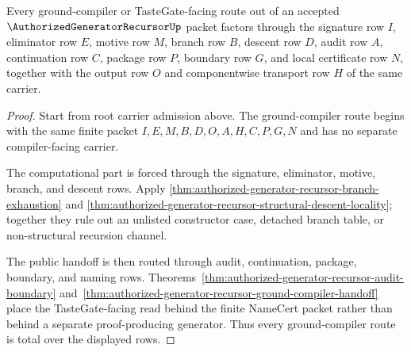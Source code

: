 \begin{theorem}
\label{thm:authorized-generator-recursor-ground-compiler-route-totality}
Every ground-compiler or TasteGate-facing route out of an accepted $\AuthorizedGeneratorRecursorUp$ packet factors through the signature row $I$, eliminator row $E$, motive row $M$, branch row $B$, descent row $D$, audit row $A$, continuation row $C$, package row $P$, boundary row $G$, and local certificate row $N$, together with the output row $O$ and componentwise transport row $H$ of the same carrier.
\end{theorem}
\begin{proof}
Start from root carrier admission above. The ground-compiler route begins with the same finite packet $I,E,M,B,D,O,A,H,C,P,G,N$ and has no separate compiler-facing carrier.

The computational part is forced through the signature, eliminator, motive, branch, and descent rows. Apply \autoref{thm:authorized-generator-recursor-branch-exhaustion} and \autoref{thm:authorized-generator-recursor-structural-descent-locality}; together they rule out an unlisted constructor case, detached branch table, or non-structural recursion channel.

The public handoff is then routed through audit, continuation, package, boundary, and naming rows. Theorems~\ref{thm:authorized-generator-recursor-audit-boundary} and~\ref{thm:authorized-generator-recursor-ground-compiler-handoff} place the TasteGate-facing read behind the finite NameCert packet rather than behind a separate proof-producing generator. Thus every ground-compiler route is total over the displayed rows.
\end{proof}


